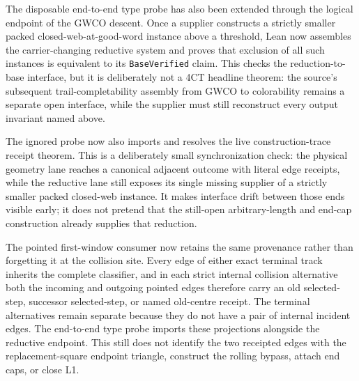\documentclass[11pt]{article}
\theoremstyle{definition}
\begin{document}
The disposable end-to-end type probe has also been extended through the
logical endpoint of the GWCO descent.  Once a supplier constructs a strictly
smaller packed closed-web-at-good-word instance above a threshold, Lean now
assembles the carrier-changing reductive system and proves that exclusion of
all such instances is equivalent to its \texttt{BaseVerified} claim.  This
checks the reduction-to-base interface, but it is deliberately not a 4CT
headline theorem: the source's subsequent trail-completability assembly from
GWCO to colorability remains a separate open interface, while the supplier
must still reconstruct every output invariant named above.

The ignored probe now also imports and resolves the live construction-trace
receipt theorem.  This is a deliberately small synchronization check: the
physical geometry lane reaches a canonical adjacent outcome with literal edge
receipts, while the reductive lane still exposes its single missing supplier
of a strictly smaller packed closed-web instance.  It makes interface drift
between those ends visible early; it does not pretend that the still-open
arbitrary-length and end-cap construction already supplies that reduction.

The pointed first-window consumer now retains the same provenance rather than
forgetting it at the collision site.  Every edge of either exact terminal
track inherits the complete classifier, and in each strict internal collision
alternative both the incoming and outgoing pointed edges therefore carry an
old selected-step, successor selected-step, or named old-centre receipt.  The
terminal alternatives remain separate because they do not have a pair of
internal incident edges.  The end-to-end type probe imports these projections
alongside the reductive endpoint.  This still does not identify the two
receipted edges with the replacement-square endpoint triangle, construct the
rolling bypass, attach end caps, or close L1.
\end{document}
